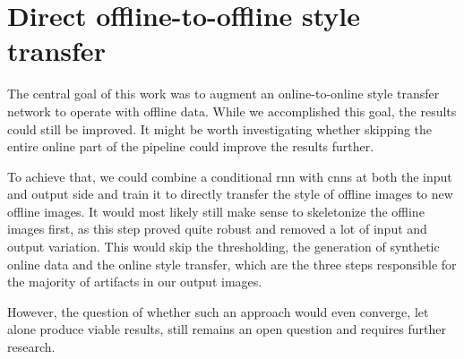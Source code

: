 \section{Direct offline-to-offline style transfer}
The central goal of this work was to augment an online-to-online style transfer network to operate with offline data. While we accomplished this goal, the results could still be improved. It might be worth investigating whether skipping the entire online part of the pipeline could improve the results further.

To achieve that, we could combine a conditional \gls{rnn} with \glspl{cnn} at both the input and output side and train it to directly transfer the style of offline images to new offline images. It would most likely still make sense to skeletonize the offline images first, as this step proved quite robust and removed a lot of input and output variation. This would skip the thresholding, the generation of synthetic online data and the online style transfer, which are the three steps responsible for the majority of artifacts in our output images.

However, the question of whether such an approach would even converge, let alone produce viable results, still remains an open question and requires further research.



